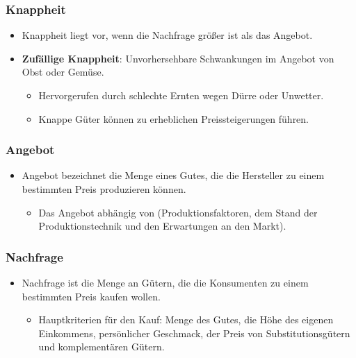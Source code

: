 \documentclass{beamer}
\begin{document}
\begin{frame}
\frametitle{Knappheit}
  \begin{itemize}
    \item
  Knappheit liegt vor, wenn die Nachfrage größer ist als
  das Angebot.
    \item
      \textbf{Zufällige Knappheit}: Unvorhersehbare Schwankungen
  im Angebot von Obst oder Gemüse.
      \begin{itemize}
        \item
  Hervorgerufen durch schlechte Ernten wegen Dürre oder
  Unwetter.
\item
Knappe Güter können zu erheblichen Preissteigerungen führen.
  \end{itemize}
      \end{itemize}
\end{frame}

\begin{frame}
\frametitle{Angebot}
  \begin{itemize}
    \item
Angebot bezeichnet die Menge eines Gutes, die die
Hersteller zu einem bestimmten Preis produzieren
können.
      \begin{itemize}
        \item
  Das Angebot abhängig von (Produktionsfaktoren, dem Stand
  der Produktionstechnik und den Erwartungen an den Markt).
      \end{itemize}
  \end{itemize}
\end{frame}

\begin{frame}
\frametitle{Nachfrage}
  \begin{itemize}
    \item
Nachfrage ist die Menge an Gütern, die die
Konsumenten zu einem bestimmten Preis kaufen wollen.

      \begin{itemize}
        \item
Hauptkriterien für den Kauf: Menge des Gutes, die Höhe des
eigenen Einkommens, persönlicher Geschmack, der Preis von
Substitutionsgütern und komplementären Gütern.
      \end{itemize}
  \end{itemize}
\end{frame}
\end{document}
